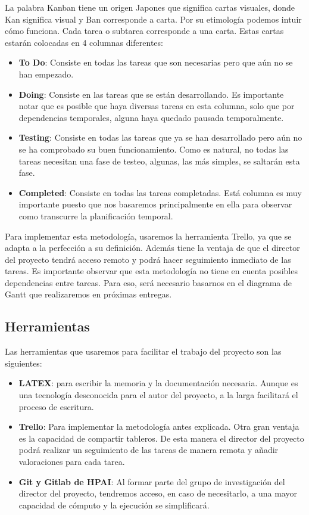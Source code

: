 La palabra Kanban tiene un origen Japones que significa cartas visuales, donde Kan significa visual y Ban corresponde a carta. Por su etimología podemos intuir cómo funciona. Cada tarea o subtarea corresponde a una carta. Estas cartas estarán colocadas en 4 columnas diferentes:

\begin{itemize}
    \item \textbf{To Do}: Consiste en todas las tareas que son necesarias pero que aún no se han empezado.
    \item \textbf{Doing}: Consiste en las tareas que se están desarrollando. Es importante notar que es posible que haya diversas tareas en esta columna, solo que por dependencias temporales, alguna haya quedado pausada temporalmente.
    \item \textbf{Testing}: Consiste en todas las tareas que ya se han desarrollado pero aún no se ha comprobado su buen funcionamiento. Como es natural, no todas las tareas necesitan una fase de testeo, algunas, las más simples, se saltarán esta fase.
    \item \textbf{Completed}: Consiste en todas las tareas completadas. Está columna es muy importante puesto que nos basaremos principalmente en ella para observar como transcurre la planificación temporal.  
\end{itemize}
Para implementar esta metodología, usaremos la herramienta Trello, ya que se adapta a la perfección a su definición. Además tiene la ventaja  de que el director del proyecto tendrá acceso remoto y podrá hacer seguimiento inmediato de las tareas. Es importante observar que esta metodología no tiene en cuenta posibles dependencias entre tareas. Para eso, será necesario basarnos en el diagrama de Gantt que realizaremos en próximas entregas.

\subsection{Herramientas}
Las herramientas que usaremos para facilitar el trabajo del proyecto son las siguientes:
\begin{itemize}
    \item \textbf{LATEX}: para escribir la memoria y la documentación necesaria. Aunque es una tecnología desconocida para el autor del proyecto, a la larga facilitará el proceso de escritura.
    \item \textbf{Trello}: Para implementar la metodología antes explicada. Otra gran ventaja es la capacidad de compartir tableros. De esta manera el director del proyecto podrá realizar un seguimiento de las tareas de manera remota y añadir valoraciones para cada tarea.
    \item \textbf{Git y Gitlab de HPAI}: Al formar parte del grupo de investigación del director del proyecto, tendremos acceso, en caso de necesitarlo, a una mayor capacidad de cómputo y la ejecución se simplificará.
\end{itemize}

